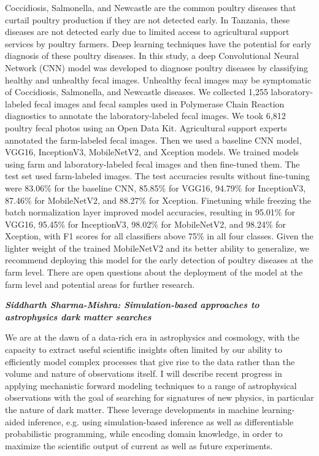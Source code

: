 Coccidiosis, Salmonella, and Newcastle are the common poultry diseases
that curtail poultry production if they are not detected early. In
Tanzania, these diseases are not detected early due to limited access to
agricultural support services by poultry farmers. Deep learning
techniques have the potential for early diagnosis of these poultry
diseases. In this study, a deep Convolutional Neural Network (CNN) model
was developed to diagnose poultry diseases by classifying healthy and
unhealthy fecal images. Unhealthy fecal images may be symptomatic of
Coccidiosis, Salmonella, and Newcastle diseases. We collected 1,255
laboratory-labeled fecal images and fecal samples used in Polymerase
Chain Reaction diagnostics to annotate the laboratory-labeled fecal
images. We took 6,812 poultry fecal photos using an Open Data Kit.
Agricultural support experts annotated the farm-labeled fecal images.
Then we used a baseline CNN model, VGG16, InceptionV3, MobileNetV2, and
Xception models. We trained models using farm and laboratory-labeled
fecal images and then fine-tuned them. The test set used farm-labeled
images. The test accuracies results without fine-tuning were 83.06\% for
the baseline CNN, 85.85\% for VGG16, 94.79\% for InceptionV3, 87.46\%
for MobileNetV2, and 88.27\% for Xception. Finetuning while freezing the
batch normalization layer improved model accuracies, resulting in
95.01\% for VGG16, 95.45\% for InceptionV3, 98.02\% for MobileNetV2, and
98.24\% for Xception, with F1 scores for all classifiers above 75\% in
all four classes. Given the lighter weight of the trained MobileNetV2
and its better ability to generalize, we recommend deploying this model
for the early detection of poultry diseases at the farm level. There are
open questions about the deployment of the model at the farm level and
potential areas for further research.

\emph{\textbf{Siddharth Sharma-Mishra: Simulation-based approaches to
astrophysics dark matter searches}}

We are at the dawn of a data-rich era in astrophysics and cosmology,
with the capacity to extract useful scientific insights often limited by
our ability to efficiently model complex processes that give rise to the
data rather than the volume and nature of observations itself. I will
describe recent progress in applying mechanistic forward modeling
techniques to a range of astrophysical observations with the goal of
searching for signatures of new physics, in particular the nature of
dark matter. These leverage developments in machine learning-aided
inference, e.g. using simulation-based inference as well as
differentiable probabilistic programming, while encoding domain
knowledge, in order to maximize the scientific output of current as well
as future experiments.

